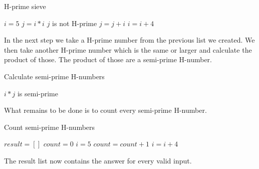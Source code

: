 \documentclass[11pt,a4paper,twoside]{article}
\begin{document}

\begin{algorithm}
    \caption{H-prime sieve}
    \label{H-prime sieve}
    \begin{algorithmic}
        \STATE $i = 5$
                \STATE $j = i*i$
                    \STATE $j$ is not H-prime %
                    \STATE $j = j + i$
                \ENDWHILE
            \ENDIF
            \STATE $i = i + 4$
        \ENDWHILE
    \end{algorithmic}
\end{algorithm}

In the next step we take a H-prime number from the previous list we created. We
then take another H-prime number which is the same or larger and calculate the
product of those. The product of those are a semi-prime H-number.

%
\begin{algorithm}
    \caption{Calculate semi-prime H-numbers}
    \label{Semi-prime H-numbers}
    \begin{algorithmic}
                \STATE $i * j$ is semi-prime
            \ENDFOR
        \ENDFOR
    \end{algorithmic}
\end{algorithm}

What remains to be done is to count every semi-prime H-number.

\begin{algorithm}
    \caption{Count semi-prime H-numbers}
    \label{Count semi-prime H-numbers}
    \begin{algorithmic}
        \STATE $result = []$
        \STATE $count = 0$
        \STATE $i = 5$
                \STATE $count = count + 1$
            \ENDIF
            \STATE $i = i + 4$
        \ENDWHILE
    \end{algorithmic}
\end{algorithm}

The result list now contains the answer for every valid input.

\end{document}
